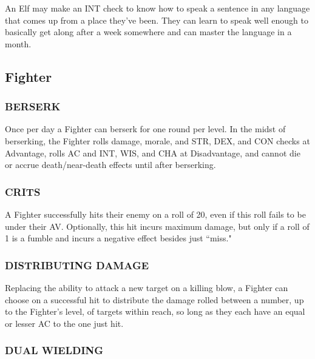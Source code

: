 \documentclass[twoside]{article}
\begin{document}
An Elf may make an INT check to know how to speak a sentence in any language that comes up from a place they've been. They can learn to speak well enough to basically get along after a week somewhere and can master the language in a month.

\subsection*{Fighter}

\subsubsection*{\footnotesize{B}\scriptsize{ERSERK}\normalsize}

Once per day a Fighter can berserk for one round per level. In the midst of berserking, the Fighter rolls damage, morale, and STR, DEX, and CON checks at Advantage, rolls AC and INT, WIS, and CHA at Disadvantage, and cannot die or accrue death/near-death effects until after berserking.

\subsubsection*{\footnotesize{C}\scriptsize{RITS}\normalsize}

A Fighter successfully hits their enemy on a roll of 20, even if this roll fails to be under their AV. Optionally, this hit incurs maximum damage, but only if a roll of 1 is a fumble and incurs a negative effect besides just ``miss."

\subsubsection*{\footnotesize{D}\scriptsize{ISTRIBUTING} \footnotesize{D}\scriptsize{AMAGE}\normalsize}

Replacing the ability to attack a new target on a killing blow, a Fighter can choose on a successful hit to distribute the damage rolled between a number, up to the Fighter's level, of targets within reach, so long as they each have an equal or lesser AC to the one just hit.

\subsubsection*{\footnotesize{D}\scriptsize{UAL} \footnotesize{W}\scriptsize{IELDING}\normalsize}
\end{document}

